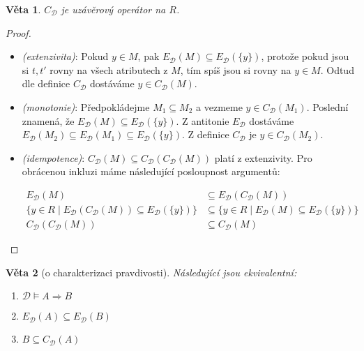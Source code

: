 \documentclass{article}
\newtheorem{theorem}{Věta}
\begin{document}
\begin{theorem}
 $C_{\mathcal{D}}$ je uzávěrový operátor na $R$.
\end{theorem}
\begin{proof}
  \begin{itemize}
  \item \emph {(extenzivita)}: Pokud $y \in M$, pak
    $E_{\mathcal{D}}(M) \subseteq E_{\mathcal{D}}(\{y\})$, protože
    pokud jsou si $t, t'$ rovny na všech atributech z $M$, tím spíš
    jsou si rovny na $y \in M$. Odtud dle definice $C_{\mathcal{D}}$
    dostáváme $y \in C_{\mathcal{D}}(M)$.

  \item \emph{(monotonie)}: Předpokládejme $M_1 \subseteq M_2$ a
    vezmeme $y \in C_{\mathcal{D}}(M_1)$. Poslední znamená, že
    $E_{\mathcal{D}}(M) \subseteq E_{\mathcal{D}}(\{y\})$. Z antitonie
    $E_{\mathcal{D}}$ dostáváme $E_{\mathcal{D}}(M_2) \subseteq
    E_{\mathcal{D}}(M_1) \subseteq E_{\mathcal{D}}(\{y\})$. Z definice
    $C_{\mathcal{D}}$ je $y \in C_{\mathcal{D}}(M_2)$.
    
  \item \emph{(idempotence)}: $C_{\mathcal{D}}(M) \subseteq
    C_{\mathcal{D}}(C_{\mathcal{D}}(M))$ platí z extenzivity. Pro
    obrácenou inkluzi máme následující posloupnost argumentů:

    \begin {align*}
      E_{\mathcal{D}}(M) &\subseteq E_{\mathcal{D}}(C_{\mathcal{D}}(M))
      \\
      \{y \in R \mid E_{\mathcal{D}}(C_{\mathcal{D}}(M)) \subseteq
      E_{\mathcal{D}}(\{y\})\} &\subseteq \{y \in R \mid
      E_{\mathcal{D}}(M) \subseteq E_{\mathcal{D}}(\{y\})\}
      \\
      C_{\mathcal{D}}(C_{\mathcal{D}}(M)) &\subseteq
      C_{\mathcal{D}}(M)
    \end {align*}
\end{itemize}
\end{proof}

\begin{theorem}[o charakterizaci pravdivosti]
Následující jsou ekvivalentní:
\begin{enumerate}
\item
$\mathcal{D} \models A \Rightarrow B$
\item
$E_{\mathcal{D}}(A) \subseteq E_{\mathcal{D}}(B)$
\item
$B \subseteq C_{\mathcal{D}}(A)$
\end{enumerate}
\end{theorem}
\end{document}
